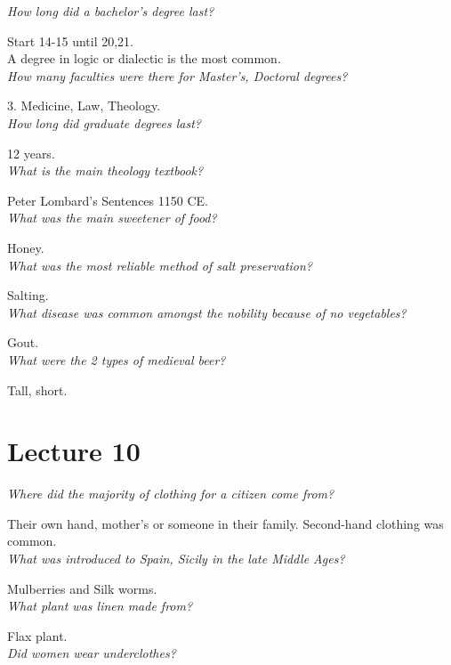 \documentclass[12pt]{article}
\begin{document}
\textit{How long did a bachelor's degree last?}

Start 14-15 until 20,21.\\ A degree in logic or dialectic is the most common.\\

\textit{How many faculties were there for Master's, Doctoral degrees?}

3. Medicine, Law, Theology.\\

\textit{How long did graduate degrees last?}

12 years.\\

\textit{What is the main theology textbook?}

Peter Lombard's Sentences 1150 CE.\\

\textit{What was the main sweetener of food?}

Honey.\\

\textit{What was the most reliable method of salt preservation?}

Salting.\\

\textit{What disease was common amongst the nobility because of no vegetables?}

Gout.\\

\textit{What were the 2 types of medieval beer?}

Tall, short.\\


\section*{Lecture 10}

\textit{Where did the majority of clothing for a citizen come from?}

Their own hand, mother's or someone in their family. Second-hand clothing was common.\\

\textit{What was introduced to Spain, Sicily in the late Middle Ages?}

Mulberries and Silk worms.\\

\textit{What plant was linen made from?}

Flax plant.\\

\textit{Did women wear underclothes?}
\end{document}
